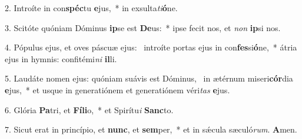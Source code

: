 2. Introíte in con\textbf{spéc}tu \textbf{e}jus,~*  in exsulta\textit{ti}\textbf{ó}ne.\

3. Scitóte quóniam Dóminus \textbf{ip}se est \textbf{De}us:~*  ipse fecit nos, et \textit{non} \textbf{ip}si nos.\

4. Pópulus ejus, et oves páscuæ ejus: \dag\  introíte portas ejus in con\textbf{fes}si\textbf{ó}ne,~*  átria ejus in hymnis: confitémi\textit{ni} \textbf{il}li.\

5. Laudáte nomen ejus: quóniam suávis est Dóminus, \dag\  in ætérnum miseri\textbf{cór}dia \textbf{e}jus,~*  et usque in generatiónem et generatiónem véri\textit{tas} \textbf{e}jus.\

6. Glória \textbf{Pa}tri, et \textbf{Fí}\textbf{li}o,~*  et Spirítu\textit{i} \textbf{Sanc}to.\

7. Sicut erat in princípio, et \textbf{nunc}, et \textbf{sem}per,~*  et in sǽcula sæculó\textit{rum}. \textbf{A}men.\

